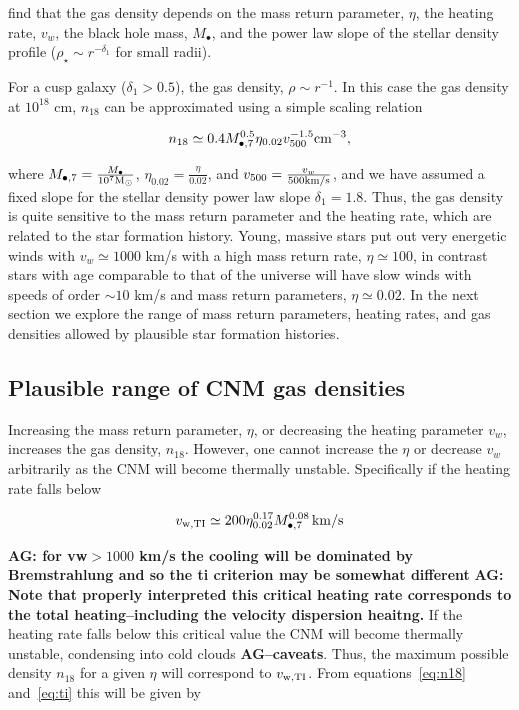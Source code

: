 \documentclass[usenatbib,fleqn]{mnras}
\newcommand{\Mbh}[1][]{M_{\bullet#1}}
\newcommand{\Msun}{{\rm M_\odot}}
\begin{document}
\citet{Generozov+2015} find that the gas density depends on the
mass return parameter, $\eta$, the heating rate, $v_w$, the black hole
mass, $\Mbh$, and the power law slope of the stellar density profile
($\rho_\star\sim r^{-\delta_1}$ for small radii).

For a cusp galaxy ($\delta_1> 0.5$), the gas density, $\rho\sim
r^{-1}$. In this case the gas density at $10^{18}$ cm, $n_{18}$ can be
approximated using a simple scaling relation 

\begin{equation}
n_{18}\simeq 0.4 \Mbh[,7]^{0.5} \eta_{0.02} v_{500}^{-1.5} {\rm
  cm^{-3}},
\label{eq:n18}
\end{equation}

where $\Mbh[,7]=\frac{\Mbh}{10^7 \Msun}$,
$\eta_{0.02}=\frac{\eta}{0.02}$, and $v_{500}=\frac{v_w}{500 {\rm
    km/s}}$, and we have assumed a fixed slope for the stellar density
power law slope $\delta_1=1.8$. Thus, the gas density is quite
sensitive to the mass return parameter and the heating rate, which are
related to the star formation history. Young, massive stars put out
very energetic winds with $v_w\simeq 1000$ km/s with a high mass
return rate, $\eta\simeq 100$, in contrast stars with age comparable
to that of the universe will have slow winds with speeds of order $\sim
10$ km/s and mass return parameters, $\eta\simeq0.02$. In the next
section we explore the range of mass return parameters, heating rates,
and gas densities allowed by plausible star formation histories.

\subsection{Plausible range of CNM gas densities}
Increasing the mass return parameter, $\eta$, or decreasing the
heating parameter $v_w$, increases the gas density, $n_{18}$.
However, one cannot increase the $\eta$ or decrease $v_w$ arbitrarily
as the CNM will become thermally unstable. Specifically if the heating
rate falls below

\begin{equation}
v_{\rm w,TI}\simeq 200 \eta_{0.02}^{0.17} \Mbh[,7]^{0.08} \,{\rm km/s} 
\label{eq:ti}
\end{equation}

{\bf AG: for vw$>1000$ km/s the cooling will be dominated by
  Bremstrahlung and so the ti criterion may be somewhat different} {\bf
  AG: Note that properly interpreted this critical heating rate
  corresponds to the total heating--including the velocity dispersion
  heaitng.}  
If the heating rate falls below this critical value the
CNM will become thermally unstable, condensing into cold clouds {\bf
  AG--caveats}. Thus, the maximum possible density $n_{18}$ for a
given $\eta$ will correspond to $v_{\rm w,TI}$. From
equations~\eqref{eq:n18} and~\eqref{eq:ti} this will be given by
\end{document}
